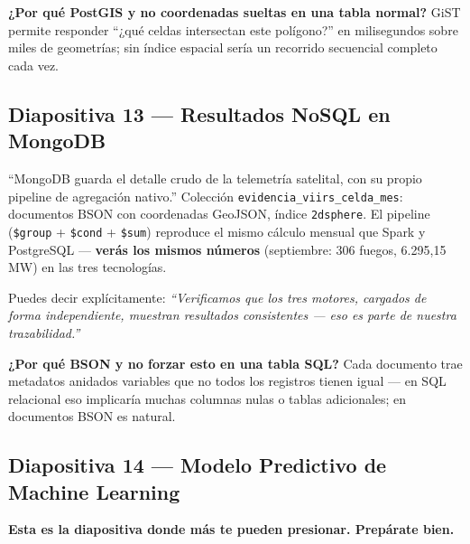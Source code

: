 \documentclass[11pt,a4paper]{article}
\begin{document}
\begin{alertabox}
\textbf{¿Por qu\'e PostGIS y no coordenadas sueltas en una tabla normal?} GiST permite responder ``¿qu\'e celdas intersectan este pol\'igono?'' en milisegundos sobre miles de geometr\'ias; sin \'indice espacial ser\'ia un recorrido secuencial completo cada vez.
\end{alertabox}

\subsection{Diapositiva 13 --- Resultados NoSQL en MongoDB}

\begin{decirbox}
``MongoDB guarda el detalle crudo de la telemetr\'ia satelital, con su propio pipeline de agregaci\'on nativo.'' Colecci\'on \texttt{evidencia\_viirs\_celda\_mes}: documentos BSON con coordenadas GeoJSON, \'indice \texttt{2dsphere}. El pipeline (\texttt{\$group} + \texttt{\$cond} + \texttt{\$sum}) reproduce el mismo c\'alculo mensual que Spark y PostgreSQL --- \textbf{ver\'as los mismos n\'umeros} (septiembre: 306 fuegos, 6.295,15\,MW) en las tres tecnolog\'ias.
\end{decirbox}

\begin{datobox}
Puedes decir expl\'icitamente: \emph{``Verificamos que los tres motores, cargados de forma independiente, muestran resultados consistentes --- eso es parte de nuestra trazabilidad.''}
\end{datobox}

\begin{alertabox}
\textbf{¿Por qu\'e BSON y no forzar esto en una tabla SQL?} Cada documento trae metadatos anidados variables que no todos los registros tienen igual --- en SQL relacional eso implicar\'ia muchas columnas nulas o tablas adicionales; en documentos BSON es natural.
\end{alertabox}

\newpage
\subsection{Diapositiva 14 --- Modelo Predictivo de Machine Learning}
\textbf{Esta es la diapositiva donde m\'as te pueden presionar. Prep\'arate bien.}
\end{document}
